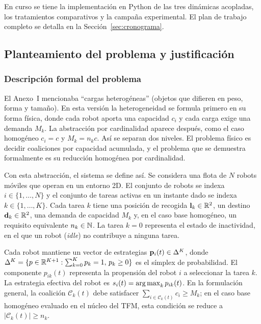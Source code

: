 En curso se tiene la implementación en Python de las tres dinámicas acopladas, los
tratamientos comparativos y la campaña experimental. El plan de trabajo
completo se detalla en la Sección~\ref{sec:cronograma}.

\subsection{Planteamiento del problema y justificación}
\label{sec:planteamiento}

\subsubsection{Descripción formal del problema}

El Anexo~I mencionaba ``cargas heterogéneas'' (objetos que difieren
en peso, forma y tamaño). En esta versión la heterogeneidad se formula primero en
su forma física, donde cada robot aporta una capacidad $c_i$ y cada carga exige una demanda
$M_k$. La abstracción por cardinalidad aparece después, como el caso homogéneo
$c_i=c$ y $M_k=n_kc$. Así se separan dos niveles. El problema físico es decidir
coaliciones por capacidad acumulada, y el problema que se demuestra formalmente
es su reducción homogénea por cardinalidad.

Con esta abstracción, el sistema se define así. Se considera una flota de $N$ robots móviles que
operan en un entorno 2D. El conjunto de robots se indexa
$i \in \{1, \ldots, N\}$ y el conjunto de tareas activas en un instante dado se indexa
$k \in \{1, \ldots, K\}$. Cada tarea $k$ tiene una posición de recogida
$\mathbf{l}_k \in \mathbb{R}^2$, un destino $\mathbf{d}_k \in \mathbb{R}^2$, una demanda de capacidad
$M_k$ y, en el caso base homogéneo, un requisito equivalente $n_k \in \mathbb{N}$. La tarea
$k=0$ representa el estado de inactividad, en el que un robot (\textit{idle}) no
contribuye a ninguna tarea.

Cada robot mantiene un vector de estrategias $\mathbf{p}_i(t) \in \Delta^K$,
donde $\Delta^K = \{p \in \mathbb{R}^{K+1} : \sum_{k=0}^K p_k = 1,\, p_k \geq 0\}$
es el símplex de probabilidad. El componente $p_{ik}(t)$ representa la propensión
del robot $i$ a seleccionar la tarea $k$. La estrategia efectiva del robot es
$s_i(t) = \operatorname*{arg\,max}_k p_{ik}(t)$. En la formulación general, la coalición
$\mathcal{C}_k(t)$ debe satisfacer $\sum_{i\in\mathcal{C}_k(t)} c_i \geq M_k$; 
en el caso base homogéneo evaluado en el
núcleo del TFM, esta condición se reduce a $|\mathcal{C}_k(t)| \geq n_k$.

